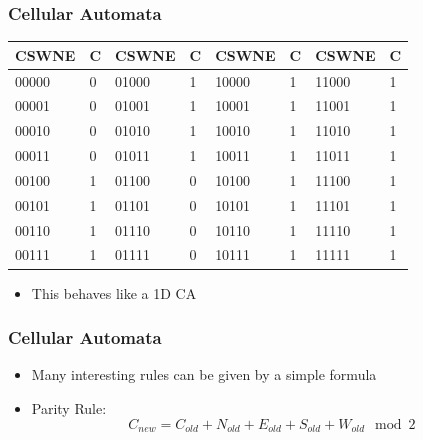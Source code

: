 \documentclass{beamer}
\begin{document}
\begin{frame}
    \frametitle{Cellular Automata}
    \begin{table}[H]
        \begin{tabular}{l|l|l|l|l|l|l|l}
        CSWNE & C & CSWNE & C & CSWNE & C & CSWNE & C \\
        \hline
        00000 & 0 & 01000 & 1 & 10000 & 1 & 11000 & 1 \\
        00001 & 0 & 01001 & 1 & 10001 & 1 & 11001 & 1 \\
        00010 & 0 & 01010 & 1 & 10010 & 1 & 11010 & 1 \\
        00011 & 0 & 01011 & 1 & 10011 & 1 & 11011 & 1 \\
        00100 & 1 & 01100 & 0 & 10100 & 1 & 11100 & 1 \\
        00101 & 1 & 01101 & 0 & 10101 & 1 & 11101 & 1 \\
        00110 & 1 & 01110 & 0 & 10110 & 1 & 11110 & 1 \\
        00111 & 1 & 01111 & 0 & 10111 & 1 & 11111 & 1
        \end{tabular}
    \end{table}
    \begin{itemize}
        \item This behaves like a 1D CA
    \end{itemize}
\end{frame}

\begin{frame}
    \frametitle{Cellular Automata}
    \begin{itemize}
        \item Many interesting rules can be given by a simple formula
        \item Parity Rule:
        \begin{equation*}
            C_{new} = C_{old} + N_{old} + E_{old} + S_{old} + W_{old} \mod 2
        \end{equation*}
    \end{itemize}
\end{frame}
\end{document}
